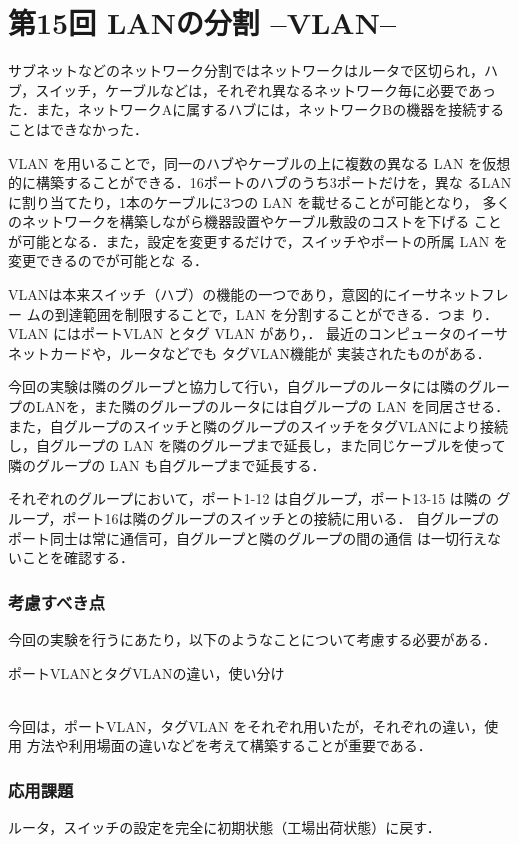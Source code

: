 \section{第15回 LANの分割 --VLAN--}

サブネットなどのネットワーク分割ではネットワークはルータで区切られ，ハ
ブ，スイッチ，ケーブルなどは，それぞれ異なるネットワーク毎に必要であっ
た．また，ネットワークAに属するハブには，ネットワークBの機器を接続する
ことはできなかった．

VLAN を用いることで，同一のハブやケーブルの上に複数の異なる LAN を仮想
的に構築することができる．16ポートのハブのうち3ポートだけを，異な
るLANに割り当てたり，1本のケーブルに3つの LAN を載せることが可能となり，
多くのネットワークを構築しながら機器設置やケーブル敷設のコストを下げる
ことが可能となる．また，設定を変更するだけで，スイッチやポートの所属
LAN を変更できるので\textbf{}が可能とな
る．

VLANは本来スイッチ（ハブ）の機能の一つであり，意図的にイーサネットフレー
ムの到達範囲を制限することで，LAN を分割することができる．つま
り\textbf{}．
VLAN にはポートVLAN とタグ VLAN があり，\textbf{}．
最近のコンピュータのイーサネットカードや，ルータなどでも タグVLAN機能が
実装されたものがある．

今回の実験は隣のグループと協力して行い，自グループのルータには隣のグルー
プのLANを，また隣のグループのルータには自グループの LAN を同居させる．
また，自グループのスイッチと隣のグループのスイッチをタグVLANにより接続
し，自グループの LAN を隣のグループまで延長し，また同じケーブルを使って
隣のグループの LAN も自グループまで延長する．

それぞれのグループにおいて，ポート1-12 は自グループ，ポート13-15 は隣の
グループ，ポート16は隣のグループのスイッチとの接続に用いる．
自グループのポート同士は常に通信可，自グループと隣のグループの間の通信
は一切行えないことを確認する．

\subsubsection*{考慮すべき点}
今回の実験を行うにあたり，以下のようなことについて考慮する必要がある．
\begin{itemize}
  {\bf \item{ポートVLANとタグVLANの違い，使い分け}}\\
  今回は，ポートVLAN，タグVLAN をそれぞれ用いたが，それぞれの違い，使用
  方法や利用場面の違いなどを考えて構築することが重要である．
\end{itemize}

\subsubsection*{応用課題}
ルータ，スイッチの設定を完全に初期状態（工場出荷状態）に戻す．

